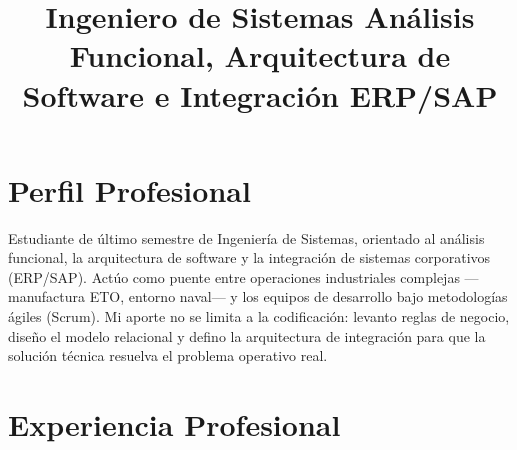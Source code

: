 \documentclass[11pt,a4paper,sans]{moderncv}
\title{Ingeniero de Sistemas \textbar{} Análisis Funcional, Arquitectura de Software e Integración ERP/SAP}
\begin{document}
\makecvtitle
\vspace*{-8mm}

\section{Perfil Profesional}

Estudiante de último semestre de Ingeniería de Sistemas, orientado al análisis
funcional, la arquitectura de software y la integración de sistemas corporativos
(ERP/SAP). Actúo como puente entre operaciones industriales complejas —manufactura
ETO, entorno naval— y los equipos de desarrollo bajo metodologías ágiles (Scrum).
Mi aporte no se limita a la codificación: levanto reglas de negocio, diseño el
modelo relacional y defino la arquitectura de integración para que la solución
técnica resuelva el problema operativo real.

\section{Experiencia Profesional}
\end{document}
